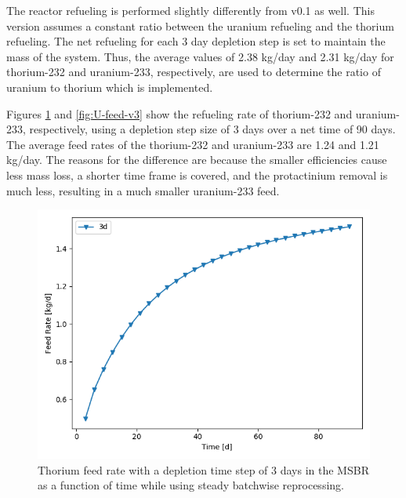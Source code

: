 The reactor refueling is performed slightly differently from v0.1 as well. This version assumes a constant ratio between the uranium refueling and the thorium refueling. The net refueling for each 3 day depletion step is set to maintain the mass of the system. Thus, the average values of 2.38 kg/day and 2.31 kg/day for thorium-232 and uranium-233, respectively, are used to determine the ratio of uranium to thorium which is implemented.

Figures \ref{fig:Th-feed-v3} and \ref{fig:U-feed-v3} show the refueling rate of thorium-232 and uranium-233, respectively, using a depletion step size of 3 days over a net time of 90 days. The average feed rates of the thorium-232 and uranium-233 are 1.24 and 1.21 kg/day. The reasons for the difference are because the smaller efficiencies cause less mass loss, a shorter time frame is covered, and the protactinium removal is much less, resulting in a much smaller uranium-233 feed.

\begin{figure}[H]
  \centering
  \includegraphics[scale=0.75]{images/feed_Th232_3d_90d.png}
  \caption{Thorium feed rate with a depletion time step of 3 days in the MSBR as a function of time while using steady batchwise reprocessing.}
   \label{fig:Th-feed-v3}
\end{figure}

